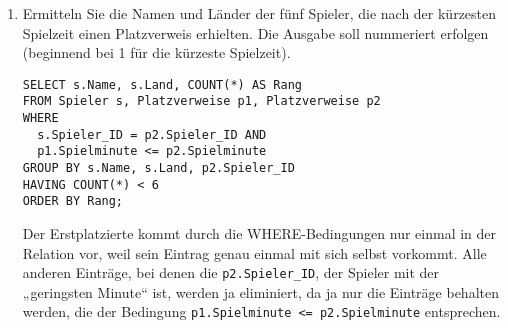 \documentclass{lehramt-informatik-aufgabe}
\begin{document}
\begin{enumerate}

\item Ermitteln Sie die Namen und Länder der fünf Spieler, die nach der
kürzesten Spielzeit einen Platzverweis erhielten. Die Ausgabe soll
nummeriert erfolgen (beginnend bei 1 für die kürzeste Spielzeit).

\begin{liAntwort}
\begin{verbatim}
SELECT s.Name, s.Land, COUNT(*) AS Rang
FROM Spieler s, Platzverweise p1, Platzverweise p2
WHERE
  s.Spieler_ID = p2.Spieler_ID AND
  p1.Spielminute <= p2.Spielminute
GROUP BY s.Name, s.Land, p2.Spieler_ID
HAVING COUNT(*) < 6
ORDER BY Rang;
\end{verbatim}

Der Erstplatzierte kommt durch die WHERE-Bedingungen nur einmal in der
Relation vor, weil sein Eintrag genau einmal mit sich selbst vorkommt.
Alle anderen Einträge, bei denen die \texttt{p2.Spieler\_ID}, der
Spieler mit der „geringsten Minute“ ist, werden ja eliminiert, da ja nur
die Einträge behalten werden, die der Bedingung \texttt{p1.Spielminute
<= p2.Spielminute} entsprechen.
\end{liAntwort}

\end{enumerate}
\end{document}
